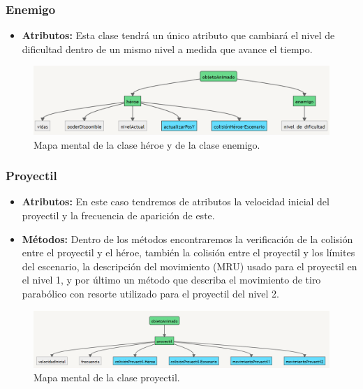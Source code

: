 \documentclass{article}
\begin{document}
    \subsubsection{Enemigo}
    \begin{itemize}
        \item \textbf{Atributos:} Esta clase tendrá un único atributo que cambiará el nivel de dificultad dentro de un mismo nivel a medida que avance el tiempo.
    \end{itemize}
    
\begin{figure}[h]
\includegraphics[scale=0.5]{Images/Heroe-enemigo.png}
\centering
\caption{Mapa mental de la clase héroe y de la clase enemigo.}
\label{fig:mmheroe}
\end{figure}
    
    \subsubsection{Proyectil}
    \begin{itemize}
        \item \textbf{Atributos:} En este caso tendremos de atributos la velocidad inicial del  proyectil y la frecuencia de aparición de este.
        \item \textbf{Métodos:} Dentro de los métodos encontraremos la verificación de la colisión entre el proyectil y el héroe, también la colisión entre el proyectil y los límites del escenario, la descripción del movimiento (MRU) usado para el proyectil en el nivel 1, y por último un método que describa el movimiento de tiro parabólico con resorte utilizado para el proyectil del nivel 2. 
    \end{itemize}
    
\begin{figure}[h]
\includegraphics[scale=0.5]{Images/proyectil.png}
\centering
\caption{Mapa mental de la clase proyectil.}
\label{fig:mmproy}
\end{figure}
    
\end{document}

